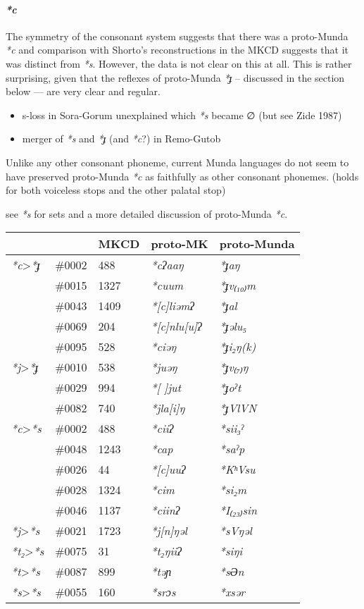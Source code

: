 \documentclass[a4paper,]{article}
\providecommand{\tightlist}{%
  \setlength{\itemsep}{0pt}\setlength{\parskip}{0pt}}
\let\oldparagraph\paragraph
\renewcommand{\paragraph}[1]{\oldparagraph{#1}\mbox{}}
\begin{document}
\paragraph{\texorpdfstring{\emph{*c}}{*c}}\label{c}

The symmetry of the consonant system suggests that there was a
proto-Munda \emph{*c} and comparison with Shorto's reconstructions in
the MKCD suggests that it was distinct from \emph{*s}. However, the data
is not clear on this at all. This is rather surprising, given that the
reflexes of proto-Munda \emph{*ɟ} -- discussed in the section below ---
are very clear and regular.

\begin{itemize}
\tightlist
\item
  s-loss in Sora-Gorum unexplained which \emph{*s} became ∅ (but see
  Zide 1987)
\item
  merger of \emph{*s} and \emph{*ɟ} (and \emph{*c}?) in Remo-Gutob
\end{itemize}

Unlike any other consonant phoneme, current Munda languages do not seem
to have preserved proto-Munda \emph{*c} as faithfully as other consonant
phonemes. (holds for both voiceless stops and the other palatal stop)

see \emph{*s} for sets and a more detailed discussion of proto-Munda
\emph{*c}.

\begin{longtable}[]{@{}lllll@{}}
\toprule
& & MKCD & proto-MK & proto-Munda\tabularnewline
\midrule
\endhead
\emph{*c}\textgreater{}\emph{*ɟ} & \#0002 & 488 & \emph{*cʔaaŋ} &
\emph{*ɟaŋ}\tabularnewline
& \#0015 & 1327 & \emph{*cuum} & \emph{*ɟv₍₁₀₎m}\tabularnewline
& \#0043 & 1409 & \emph{*{[}c{]}liəmʔ} & \emph{*ɟal}\tabularnewline
& \#0069 & 204 & \emph{*{[}c{]}nlu{[}u{]}ʔ} &
\emph{*ɟəlu₅}\tabularnewline
& \#0095 & 528 & \emph{*ciəŋ} & \emph{*ɟi₂ŋ(k)}\tabularnewline
\emph{*j}\textgreater{}\emph{*ɟ} & \#0010 & 538 & \emph{*juəŋ} &
\emph{*ɟv₍₇₎ŋ}\tabularnewline
& \#0029 & 994 & \emph{*{[} {]}jut} & \emph{*ɟoˀt}\tabularnewline
& \#0082 & 740 & \emph{*jla{[}i{]}ŋ} & \emph{*ɟVlVN}\tabularnewline
\emph{*c}\textgreater{}\emph{*s} & \#0002 & 488 & \emph{*ciiʔ} &
\emph{*sii₃ˀ}\tabularnewline
& \#0048 & 1243 & \emph{*cap} & \emph{*saˀp}\tabularnewline
& \#0026 & 44 & \emph{*{[}c{]}uuʔ} & \emph{*KʰVsu}\tabularnewline
& \#0028 & 1324 & \emph{*cim} & \emph{*si₂m}\tabularnewline
& \#0046 & 1137 & \emph{*ciinʔ} & \emph{*I₍₂₃₎sin}\tabularnewline
\emph{*j}\textgreater{}\emph{*s} & \#0021 & 1723 & \emph{*j{[}n{]}ŋəl} &
\emph{*sVŋəl}\tabularnewline
\emph{*t₂}\textgreater{}\emph{*s} & \#0075 & 31 & \emph{*t₂ŋiiʔ} &
\emph{*siŋi}\tabularnewline
\emph{*t}\textgreater{}\emph{*s} & \#0087 & 899 & \emph{*təɲ} &
\emph{*sƏn}\tabularnewline
\emph{*s}\textgreater{}\emph{*s} & \#0055 & 160 & \emph{*srɔs} &
\emph{*xsər}\tabularnewline
\bottomrule
\end{longtable}
\end{document}
